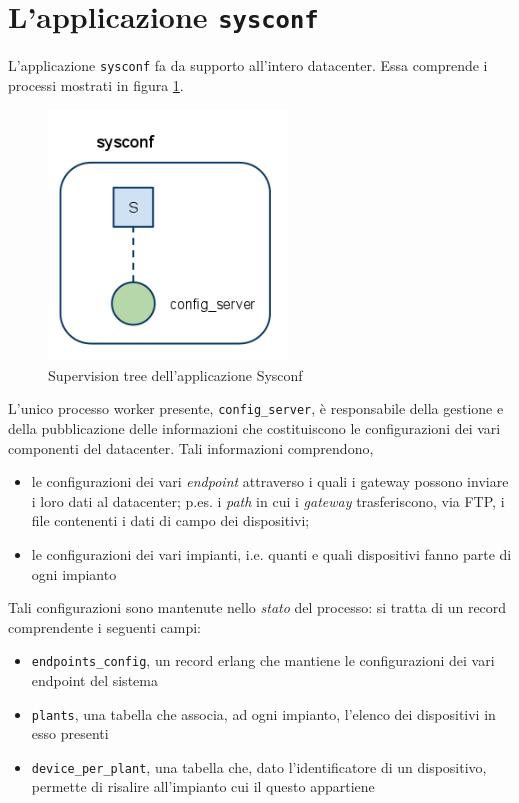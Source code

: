 \section{L'applicazione \texttt{sysconf}}
%
L'applicazione \texttt{sysconf} fa da supporto all'intero datacenter.
Essa comprende i processi mostrati in figura \ref{sysconfsuptree}.
%
\begin{figure}[!h]
\centering
\includegraphics[width=180pt]{img/sysconf.png}
\caption{Supervision tree dell'applicazione Sysconf}
\label{sysconfsuptree}
\end{figure}
%

%
L'unico processo worker presente, \texttt{config\_server}, \`e responsabile della 
gestione e della pubblicazione delle informazioni che costituiscono le configurazioni
dei vari componenti del datacenter. Tali informazioni comprendono,
%
\begin{itemize}
\item le configurazioni dei vari \emph{endpoint} attraverso i quali i gateway possono
      inviare i loro dati al datacenter; p.es. i \emph{path} in cui i \emph{gateway} 
      trasferiscono, via FTP, i file contenenti i dati di campo dei dispositivi;
%
\item le configurazioni dei vari impianti, i.e. quanti e quali dispositivi fanno 
      parte di ogni impianto
\end{itemize}
%
Tali configurazioni sono mantenute nello \emph{stato} del processo: si tratta di un record 
comprendente i seguenti campi:
%
\begin{itemize}
\item \texttt{endpoints\_config}, un record erlang che mantiene le configurazioni dei 
      vari endpoint del sistema
%
\item \texttt{plants}, una tabella che associa, ad ogni impianto, l'elenco dei dispositivi 
      in esso presenti
%
\item \texttt{device\_per\_plant}, una tabella che, dato l'identificatore di un dispositivo,
      permette di risalire all'impianto cui il questo appartiene
\end{itemize}
%


